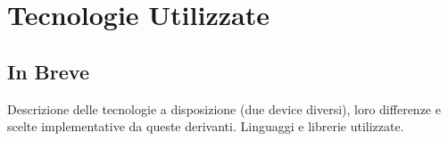 \chapter{Tecnologie Utilizzate}

\section{In Breve}
Descrizione delle tecnologie a disposizione (due device diversi), loro differenze e scelte implementative da queste derivanti. Linguaggi e librerie utilizzate. 